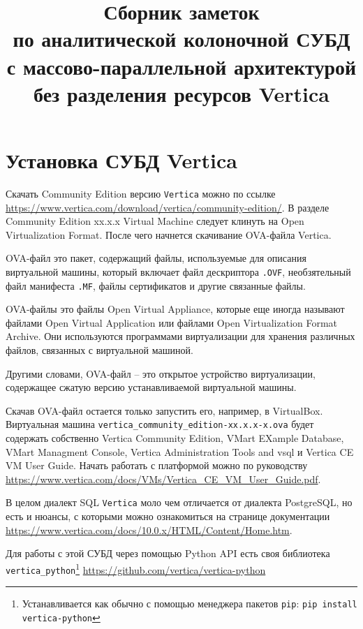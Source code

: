 \documentclass[%
	11pt,
	a4paper,
	utf8,
		]{article}
\begin{document}
\title{Сборник заметок\\по аналитической колоночной СУБД с массово-параллельной архитектурой без разделения ресурсов Vertica}

\author{}

\date{}
\maketitle

\thispagestyle{fancy}

\tableofcontents

\section{Установка СУБД Vertica}
Скачать Community Edition версию \texttt{Vertica} можно по ссылке \url{https://www.vertica.com/download/vertica/community-edition/}. В разделе Community Edition xx.x.x Virtual Machine следует клинуть на Open Virtualization Format. После чего начнется скачивание OVA-файла Vertica.

OVA-файл это пакет, содержащий файлы, используемые для описания виртуальной машины, который включает файл дескриптора \texttt{.OVF}, необзятельный файл манифеста \texttt{.MF}, файлы сертификатов и другие связанные файлы.

OVA-файлы это файлы Open Virtual Appliance, которые еще иногда называют файлами Open Virtual Application или файлами Open Virtualization Format Archive. Они используются программами виртуализации для хранения различных файлов, связанных с виртуальной машиной.

Другими словами, OVA-файл -- это открытое устройство виртуализации, содержащее сжатую версию устанавливаемой виртуальной машины.

Скачав OVA-файл остается только запустить его, например, в VirtualBox. Виртуальная машина \texttt{vertica\_community\_edition-xx.x.x-x.ova} будет содержать собственно Vertica Community Edition, VMart EXample Database, VMart Managment Console, Vertica Administration Tools and vsql и Vertica CE VM User Guide. Начать работать с платформой можно по руководству \url{https://www.vertica.com/docs/VMs/Vertica_CE_VM_User_Guide.pdf}.

В целом диалект SQL \texttt{Vertica} моло чем отличается от диалекта PostgreSQL, но есть и нюансы, с которыми можно ознакомиться на странице документации \url{https://www.vertica.com/docs/10.0.x/HTML/Content/Home.htm}.

Для работы с этой СУБД через помощью Python API есть своя библиотека \texttt{vertica\_python}\footnote{Устанавливается как обычно с помощью менеджера пакетов \texttt{pip}: \texttt{pip install vertica-python}} \url{https://github.com/vertica/vertica-python}
\end{document}
